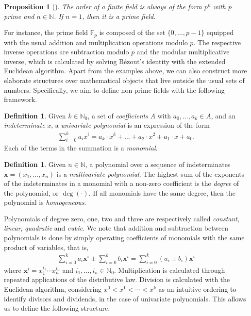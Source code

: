 \documentclass[12pt, a4paper, oneside]{memoir}
\newtheorem{proposition}[theorem]{Proposition}
\theoremstyle{definition}
\newtheorem{definition}[theorem]{Definition}
\begin{document}
\begin{proposition}[{\cite[Cor.~2.18]{Mullen:2013}}]
  The order of a finite field is always of the form $p^{n}$ with $p$ prime and $n \in \mathbb{N}$. If $n = 1$, then it is a \emph{prime field}.
\end{proposition}

For instance, the prime field $\mathbb{F}_{p}$ is composed of the set $\{0, \dots, p - 1\}$ equipped with the usual addition and multiplication operations modulo $p$. The respective inverse operations are subtraction modulo $p$ and the modular multiplicative inverse, which is calculated by solving Bézout's identity with the extended Euclidean algorithm. Apart from the examples above, we can also construct more elaborate structures over mathematical objects that live outside the usual sets of numbers. Specifically, we aim to define non-prime fields with the following framework.

\begin{definition}
  Given $k \in \mathbb{N}_{0}$, a set of \emph{coefficients} $A$ with $a_{0}, \dots, a_{k} \in A$, and an \emph{indeterminate} $x$, a \emph{univariate polynomial} is an expression of the form
  \begin{align}
    \sum_{i = 0}^{k} a_{i} x^{i}
      = a_{k} \cdot x^{k} + \dots + a_{2} \cdot x^{2} + a_{1} \cdot x + a_{0}.
  \end{align}
  Each of the terms in the summation is a \emph{monomial}.
\end{definition}

\begin{definition}
  Given $n \in \mathbb{N}$, a polynomial over a sequence of indeterminates $\mathbf{x} = (x_{1}, \dots, x_{n})$ is a \emph{multivariate polynomial}. The highest sum of the exponents of the indeterminates in a monomial with a non-zero coefficient is the \emph{degree} of the polynomial, or $\deg(\cdot)$. If all monomials have the same degree, then the polynomial is \emph{homogeneous}.
\end{definition}

Polynomials of degree zero, one, two and three are respectively called \emph{constant}, \emph{linear}, \emph{quadratic} and \emph{cubic}. We note that addition and subtraction between polynomials is done by simply operating coefficients of monomials with the same product of variables, that is,
\begin{align}
  \sum_{i = 0}^{k} a_{i} \mathbf{x}^{i} \pm \sum_{i = 0}^{k} b_{i} \mathbf{x}^{i} = \sum_{i = 0}^{k} (a_{i} \pm b_{i}) \mathbf{x}^{i}
\end{align}
where $\mathbf{x}^{i} = x_{1}^{i_{1}} \cdots x_{n}^{i_{n}}$ and $i_{1}, \dots, i_{n} \in \mathbb{N}_{0}$. Multiplication is calculated through repeated applications of the distributive law. Division is calculated with the Euclidean algorithm, considering $x^{0} < x^{1} < \cdots < x^{k}$ as an intuitive ordering to identify divisors and dividends, in the case of univariate polynomials. This allows us to define the following structure.
\end{document}
